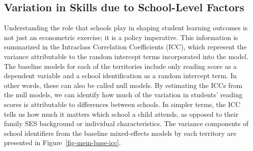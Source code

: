 \documentclass[
]{article}
\begin{document}
\begin{table}

\caption{\label{tbl-desc-stats}Gross Educational Productivity (Average
Reading Score) per Country/Territory and SES}


\end{table}%

\subsection{Variation in Skills due to School-Level
Factors}\label{variation-in-skills-due-to-school-level-factors}

Understanding the role that schools play in shaping student learning
outcomes is not just an econometric exercise; it is a policy imperative.
This information is summarized in the Intraclass Correlation
Coefficients (ICC), which represent the variance attributable to the
random intercept terms incorporated into the model. The baseline models
for each of the territories include only reading score as a dependent
variable and a school identification as a random intercept term. In
other words, these can also be called null models. By estimating the
ICCs from the null models, we can identify how much of the variation in
students' reading scores is attributable to differences between schools.
In simpler terms, the ICC tells us how much it matters which school a
child attends, as opposed to their family SES background or individual
characteristics. The variance components of school identifiers from the
baseline mixed-effects models by each territory are presented in
Figure~\ref{fig-mem-base-icc}.
\end{document}
